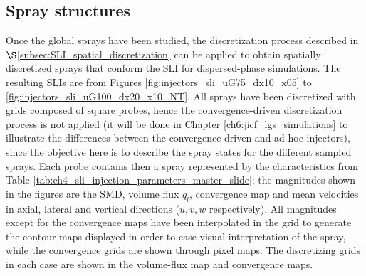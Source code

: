 


\newcommand\scaleSLIJICF{0.15}


\subsection{Spray structures}

Once the global sprays have been studied, the discretization process described in $\S$\ref{subsec:SLI_spatial_discretization} can be applied to obtain spatially discretized sprays that conform the SLI for dispersed-phase simulations. The resulting SLIs are from Figures \ref{fig:injectors_sli_uG75_dx10_x05} to \ref{fig:injectors_sli_uG100_dx20_x10_NT}. All sprays have been discretized with grids composed of square probes, hence the convergence-driven discretization process is not applied (it will be done in Chapter \ref{ch6:jicf_lgs_simulations} to illustrate the differences between the convergence-driven and ad-hoc injectors), since the objective here is to describe the spray states for the different sampled sprays. Each probe contains then a spray represented by the characteristics from Table \ref{tab:ch4_sli_injection_parameters_master_slide}: the magnitudes shown in the figures are the SMD, volume flux $q_l$, convergence map and mean velocities in axial, lateral and vertical directions ($u, v, w$ respectively). All magnitudes except for the convergence maps have been interpolated in the grid to generate the contour maps displayed in order to ease visual interpretation of the spray, while the convergence grids are shown through pixel maps. The discretizing grids in each case are shown in the volume-flux map and convergence maps.

